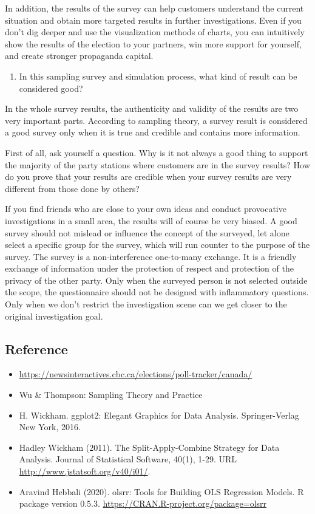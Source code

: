 \documentclass[
]{article}
\providecommand{\tightlist}{%
  \setlength{\itemsep}{0pt}\setlength{\parskip}{0pt}}
\begin{document}
In addition, the results of the survey can help customers understand the
current situation and obtain more targeted results in further
investigations. Even if you don't dig deeper and use the visualization
methods of charts, you can intuitively show the results of the election
to your partners, win more support for yourself, and create stronger
propaganda capital.

\begin{enumerate}
\def\labelenumi{\arabic{enumi}.}
\setcounter{enumi}{2}
\tightlist
\item
  In this sampling survey and simulation process, what kind of result
  can be considered good?
\end{enumerate}

In the whole survey results, the authenticity and validity of the
results are two very important parts. According to sampling theory, a
survey result is considered a good survey only when it is true and
credible and contains more information.

First of all, ask yourself a question. Why is it not always a good thing
to support the majority of the party stations where customers are in the
survey results? How do you prove that your results are credible when
your survey results are very different from those done by others?

If you find friends who are close to your own ideas and conduct
provocative investigations in a small area, the results will of course
be very biased. A good survey should not mislead or influence the
concept of the surveyed, let alone select a specific group for the
survey, which will run counter to the purpose of the survey. The survey
is a non-interference one-to-many exchange. It is a friendly exchange of
information under the protection of respect and protection of the
privacy of the other party. Only when the surveyed person is not
selected outside the scope, the questionnaire should not be designed
with inflammatory questions. Only when we don't restrict the
investigation scene can we get closer to the original investigation
goal.

\hypertarget{reference}{%
\subsection{Reference}\label{reference}}

\begin{itemize}
\tightlist
\item
  \url{https://newsinteractives.cbc.ca/elections/poll-tracker/canada/}
\item
  Wu \& Thompson: Sampling Theory and Practice
\item
  H. Wickham. ggplot2: Elegant Graphics for Data Analysis.
  Springer-Verlag New York, 2016.
\item
  Hadley Wickham (2011). The Split-Apply-Combine Strategy for Data
  Analysis. Journal of Statistical Software, 40(1), 1-29. URL
  \url{http://www.jstatsoft.org/v40/i01/}.
\item
  Aravind Hebbali (2020). olsrr: Tools for Building OLS Regression
  Models. R package version 0.5.3.
  \url{https://CRAN.R-project.org/package=olsrr}
\end{itemize}
\end{document}
